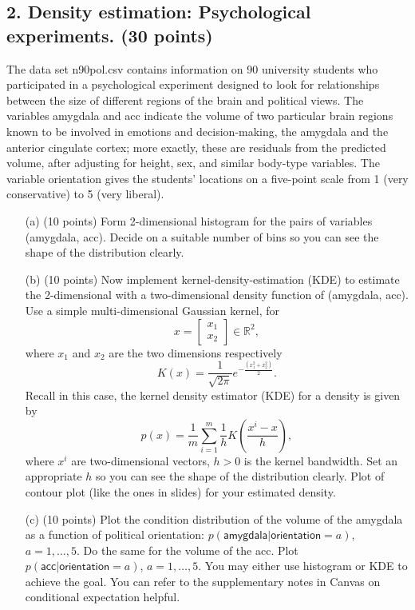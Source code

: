 \documentclass[twoside,12pt]{article}
\begin{document}
\clearpage



\subsection*{2. Density estimation: Psychological experiments. (30 points)}

 The data set \textsf{n90pol.csv} contains information on 90 university students who participated in a psychological experiment designed to look for relationships between the size of different regions of the brain and political views. The variables \textsf{amygdala} and \textsf{acc} indicate the volume of two particular brain regions known to be involved in emotions and decision-making, the amygdala and the anterior cingulate cortex; more exactly, these are residuals from the predicted volume, after adjusting for height, sex, and similar body-type variables. The variable \textsf{orientation} gives the students' locations on a five-point scale from 1 (very conservative) to 5 (very liberal).
  
 \begin{enumerate}
 \item[(a)] (10 points) Form 2-dimensional histogram for the pairs of variables (\textsf{amygdala}, \textsf{acc}). Decide on a suitable number of bins so you can see the shape of the distribution clearly. 
 
 \item[(b)] (10 points) Now implement kernel-density-estimation (KDE) to estimate the 2-dimensional with a two-dimensional density function of (\textsf{amygdala}, \textsf{acc}). Use a simple multi-dimensional Gaussian kernel, for \[x = \begin{bmatrix}x_1\\x_2\end{bmatrix}\in \mathbb R^2,\] where $x_1$ and $x_2$ are the two dimensions respectively \[K(x) = \frac{1}{\sqrt {2\pi}} e^{-\frac{(x_1^2 + x_2^2)}{2}}.\] Recall in this case, the kernel density estimator (KDE) for a density is given by
 \[
 p(x) = \frac 1 m \sum_{i=1}^m \frac 1 h
 K\left(
 \frac{x^i - x}{h}
 \right),
 \]
 where $x^i$ are two-dimensional vectors, $h >0$ is the kernel bandwidth. Set an appropriate $h$ so you can see the shape of the distribution clearly. Plot of contour plot (like the ones in slides) for your estimated density. 
 \item[(c)] (10 points) Plot the condition distribution of the volume of the \textsf{amygdala} as a function of political \textsf{orientation}: $p(\textsf{amygdala}|\textsf{orientation}=a)$, $a = 1, \ldots, 5$. Do the same for the volume of the 
 \textsf{acc}. Plot $p(\textsf{acc}|\textsf{orientation}=a)$, $a = 1, \ldots, 5$. You may either use histogram or KDE to achieve the goal. You can refer to the supplementary notes in Canvas on conditional expectation helpful.
 \end{enumerate}
\end{document}
